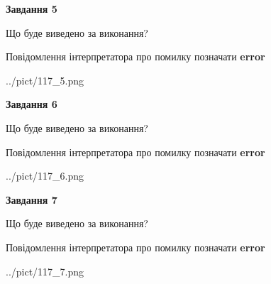 \documentclass[10pt, ukrainian]{article}
\begin{document}
{\begin {large}
{\begin {center}\textbf{Завдання 5}\end {center}}\par
Що буде виведено за виконання? \par
Повідомлення інтерпретатора про помилку позначати \textbf{error}

\begin{center}
	{../pict/117_5.png}
\end{center}
\newpage

{\begin {center}\textbf{Завдання 6}\end {center}}\par
Що буде виведено за виконання? \par
Повідомлення інтерпретатора про помилку позначати \textbf{error}

\begin{center}
	{../pict/117_6.png}
\end{center}
\newpage

{\begin {center}\textbf{Завдання 7}\end {center}}\par
Що буде виведено за виконання? \par
Повідомлення інтерпретатора про помилку позначати \textbf{error}

\begin{center}
	{../pict/117_7.png}
\end{center}
\newpage

\end {large}}
\end{document}
